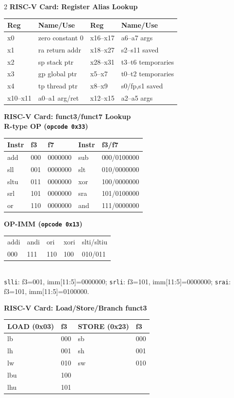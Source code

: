 \documentclass[10pt]{article}
\newcommand{\hdr}[1]{\vspace{2pt}\textbf{#1}\vspace{1pt}\\}
\begin{document}
\begin{multicols}{2}
\hdr{RISC-V Card: Register Alias Lookup}
\scriptsize
\begin{tabular}{@{}ll|ll@{}}
\toprule
\textbf{Reg} & \textbf{Name/Use} & \textbf{Reg} & \textbf{Name/Use} \\
\midrule
x0 & zero constant 0 & x16--x17 & a6--a7 args \\
x1 & ra return addr & x18--x27 & s2--s11 saved \\
x2 & sp stack ptr & x28--x31 & t3--t6 temporaries \\
x3 & gp global ptr & x5--x7 & t0--t2 temporaries \\
x4 & tp thread ptr & x8--x9 & s0/fp,s1 saved \\
x10--x11 & a0--a1 arg/ret & x12--x15 & a2--a5 args \\
\bottomrule
\end{tabular}
\footnotesize

\hdr{RISC-V Card: funct3/funct7 Lookup}
\scriptsize
\textbf{R-type OP (\texttt{opcode 0x33})}\\
\begin{tabular}{@{}lllll@{}}
\toprule
Instr & f3 & f7 & Instr & f3/f7 \\
\midrule
add & 000 & 0000000 & sub & 000/0100000 \\
sll & 001 & 0000000 & slt & 010/0000000 \\
sltu & 011 & 0000000 & xor & 100/0000000 \\
srl & 101 & 0000000 & sra & 101/0100000 \\
or & 110 & 0000000 & and & 111/0000000 \\
\bottomrule
\end{tabular}

\textbf{OP-IMM (\texttt{opcode 0x13})}\\
\begin{tabular}{@{}lllll@{}}
\toprule
addi & andi & ori & xori & slti/sltiu \\
000 & 111 & 110 & 100 & 010/011 \\
\bottomrule
\end{tabular}\\
\texttt{slli}: f3=001, imm[11:5]=0000000; \texttt{srli}: f3=101, imm[11:5]=0000000; \texttt{srai}: f3=101, imm[11:5]=0100000.
\footnotesize

\hdr{RISC-V Card: Load/Store/Branch funct3}
\scriptsize
\begin{tabular}{@{}llll@{}}
\toprule
\textbf{LOAD (0x03)} & \textbf{f3} & \textbf{STORE (0x23)} & \textbf{f3} \\
\midrule
lb & 000 & sb & 000 \\
lh & 001 & sh & 001 \\
lw & 010 & sw & 010 \\
lbu & 100 & & \\
lhu & 101 & & \\
\bottomrule
\end{tabular}


\end{multicols}
\end{document}
